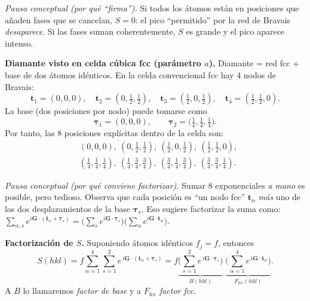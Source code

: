 \documentclass{article}
\begin{document}
\medskip
\noindent\textit{Pausa conceptual (por qué “firma”).}  
Si todos los átomos están en posiciones que añaden fases que se cancelan, \(S=0\): el pico “permitido” por la red de Bravais \emph{desaparece}. Si las fases suman coherentemente, \(S\) es grande y el pico aparece intenso.

\bigskip
\textbf{Diamante visto en celda cúbica fcc (parámetro \(a\)).}  
Diamante = red fcc + base de dos átomos idénticos. En la celda convencional fcc hay 4 nodos de Bravais:
\[
\mathbf{t}_1=(0,0,0),\quad \mathbf{t}_2=(0,\tfrac12,\tfrac12),\quad
\mathbf{t}_3=(\tfrac12,0,\tfrac12),\quad \mathbf{t}_4=(\tfrac12,\tfrac12,0).
\]
La base (dos posiciones por nodo) puede tomarse como
\[
\boldsymbol{\tau}_1=(0,0,0),\qquad
\boldsymbol{\tau}_2=\Big(\tfrac14,\tfrac14,\tfrac14\Big).
\]
Por tanto, las 8 posiciones explícitas dentro de la celda son:
\[
\begin{aligned}
&(0,0,0),\ (0,\tfrac12,\tfrac12),\ (\tfrac12,0,\tfrac12),\ (\tfrac12,\tfrac12,0),\\
&(\tfrac14,\tfrac14,\tfrac14),\ (\tfrac14,\tfrac34,\tfrac34),\ (\tfrac34,\tfrac14,\tfrac34),\ (\tfrac34,\tfrac34,\tfrac14).
\end{aligned}
\]

\medskip
\noindent\textit{Pausa conceptual (por qué conviene factorizar).}  
Sumar 8 exponenciales \emph{a mano} es posible, pero tedioso. Observa que cada posición es “un nodo fcc” \(\mathbf{t}_\alpha\) \emph{más} uno de los dos desplazamientos de la base \(\boldsymbol{\tau}_s\).  
Eso sugiere factorizar la suma como: \(\sum_{\alpha,s} e^{i\mathbf{G}\cdot(\mathbf{t}_\alpha+\boldsymbol{\tau}_s)} = \big(\sum_s e^{i\mathbf{G}\cdot\boldsymbol{\tau}_s}\big)\big(\sum_\alpha e^{i\mathbf{G}\cdot\mathbf{t}_\alpha}\big)\).

\bigskip
\textbf{Factorización de \(S\).}  
Suponiendo átomos idénticos \(f_j=f\), entonces
\[
S(hkl)= f \sum_{\alpha=1}^{4}\sum_{s=1}^{2} e^{\,i\mathbf{G}\cdot(\mathbf{t}_\alpha+\boldsymbol{\tau}_s)}
= f\underbrace{\Big(\sum_{s=1}^{2} e^{\,i\mathbf{G}\cdot\boldsymbol{\tau}_s}\Big)}_{\displaystyle B(hkl)}\;
\underbrace{\Big(\sum_{\alpha=1}^{4} e^{\,i\mathbf{G}\cdot\mathbf{t}_\alpha}\Big)}_{\displaystyle F_\text{fcc}(hkl)}.
\]
A \(B\) lo llamaremos \emph{factor de base} y a \(F_\text{fcc}\) \emph{factor fcc}.
\end{document}
